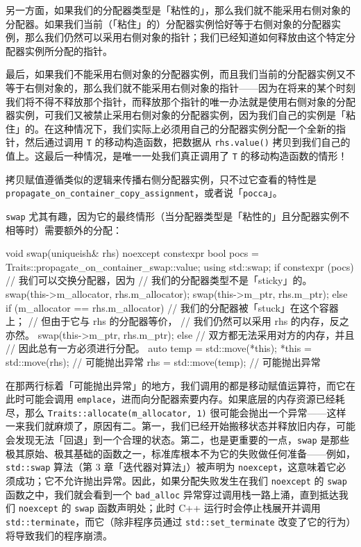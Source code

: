 另一方面，如果我们的分配器类型是「粘性的」，那么我们就不能采用右侧对象的分配器。如果我们当前（「粘住」的）分配器实例恰好等于右侧对象的分配器实例，那么我们仍然可以采用右侧对象的指针；我们已经知道如何释放由这个特定分配器实例所分配的指针。

最后，如果我们不能采用右侧对象的分配器实例，而且我们当前的分配器实例又不等于右侧对象的，那么我们就不能采用右侧对象的指针——因为在将来的某个时刻我们将不得不释放那个指针，而释放那个指针的唯一办法就是使用右侧对象的分配器实例，可我们又被禁止采用右侧对象的分配器实例，因为我们自己的实例是「粘住」的。在这种情况下，我们实际上必须用自己的分配器实例分配一个全新的指针，然后通过调用 \texttt{T} 的移动构造函数，把数据从 \texttt{rhs.\allowbreak{}value(\allowbreak{})\allowbreak{}} 拷贝到我们自己的值上。这最后一种情况，是唯一一处我们真正调用了 \texttt{T} 的移动构造函数的情形！

拷贝赋值遵循类似的逻辑来传播右侧分配器实例，只不过它查看的特性是 \texttt{propagate\_\allowbreak{}on\_\allowbreak{}container\_\allowbreak{}copy\_\allowbreak{}assignment}，或者说「\texttt{pocca}」。

\texttt{swap} 尤其有趣，因为它的最终情形（当分配器类型是「粘性的」且分配器实例不相等时）需要额外的分配：

\begin{codebox}[cpp]
    void swap(uniqueish& rhs) noexcept {
      constexpr bool pocs =
        Traits::propagate_on_container_swap::value;
      using std::swap;
      if constexpr (pocs) {
        // 我们可以交换分配器，因为
        // 我们的分配器类型不是「sticky」的。
        swap(this->m_allocator, rhs.m_allocator);
        swap(this->m_ptr, rhs.m_ptr);
      } else if (m_allocator == rhs.m_allocator) {
        // 我们的分配器被「stuck」在这个容器上；
        // 但由于它与 rhs 的分配器等价，
        // 我们仍然可以采用 rhs 的内存，反之亦然。
        swap(this->m_ptr, rhs.m_ptr);
      } else {
        // 双方都无法采用对方的内存，并且
        // 因此总有一方必须进行分配。
        auto temp = std::move(*this);
        *this = std::move(rhs); // 可能抛出异常
        rhs = std::move(temp); // 可能抛出异常
      }
    }
\end{codebox}

在那两行标着「可能抛出异常」的地方，我们调用的都是移动赋值运算符，而它在此时可能会调用 \texttt{emplace}，进而向分配器索要内存。如果底层的内存资源已经耗尽，那么 \texttt{Traits::\allowbreak{}allocate(\allowbreak{}m\_\allowbreak{}allocator,\allowbreak{} 1)\allowbreak{}} 很可能会抛出一个异常——这样一来我们就麻烦了，原因有二。第一，我们已经开始搬移状态并释放旧内存，可能会发现无法「回退」到一个合理的状态。第二，也是更重要的一点，\texttt{swap} 是那些极其原始、极其基础的函数之一，标准库根本不为它的失败做任何准备——例如，\texttt{std::\allowbreak{}swap} 算法（第 3 章「迭代器对算法」）被声明为 \texttt{noexcept}，这意味着它必须成功；它不允许抛出异常。因此，如果分配失败发生在我们 \texttt{noexcept} 的 \texttt{swap} 函数之中，我们就会看到一个 \texttt{bad\_\allowbreak{}alloc} 异常穿过调用栈一路上涌，直到抵达我们 \texttt{noexcept} 的 \texttt{swap} 函数声明处；此时 C++ 运行时会停止栈展开并调用 \texttt{std::\allowbreak{}terminate}，而它（除非程序员通过 \texttt{std::\allowbreak{}set\_\allowbreak{}terminate} 改变了它的行为）将导致我们的程序崩溃。


